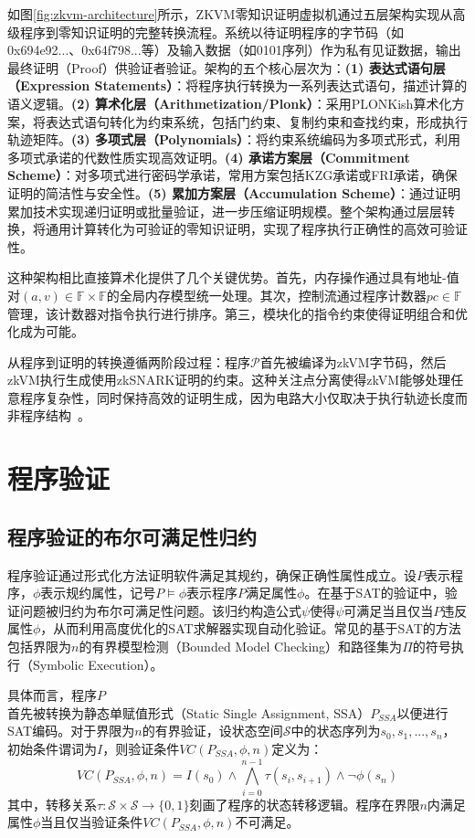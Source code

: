 如图\ref{fig:zkvm-architecture}所示，ZKVM零知识证明虚拟机通过五层架构实现从高级程序到零知识证明的完整转换流程。系统以待证明程序的字节码（如0x694e92...、0x64f798...等）及输入数据（如0101序列）作为私有见证数据，输出最终证明（Proof）供验证者验证。架构的五个核心层次为：\textbf{(1) 表达式语句层（Expression Statements）}：将程序执行转换为一系列表达式语句，描述计算的语义逻辑。\textbf{(2) 算术化层（Arithmetization/Plonk）}：采用PLONKish算术化方案，将表达式语句转化为约束系统，包括门约束、复制约束和查找约束，形成执行轨迹矩阵。\textbf{(3) 多项式层（Polynomials）}：将约束系统编码为多项式形式，利用多项式承诺的代数性质实现高效证明。\textbf{(4) 承诺方案层（Commitment Scheme）}：对多项式进行密码学承诺，常用方案包括KZG承诺或FRI承诺，确保证明的简洁性与安全性。\textbf{(5) 累加方案层（Accumulation Scheme）}：通过证明累加技术实现递归证明或批量验证，进一步压缩证明规模。整个架构通过层层转换，将通用计算转化为可验证的零知识证明，实现了程序执行正确性的高效可验证性。

这种架构相比直接算术化提供了几个关键优势。首先，内存操作通过具有地址-值对$(a, v) \in \mathbb{F} \times \mathbb{F}$的全局内存模型统一处理。其次，控制流通过程序计数器$pc \in \mathbb{F}$管理，该计数器对指令执行进行排序。第三，模块化的指令约束使得证明组合和优化成为可能。\cite{cryptoeprint:2020/1069}

从程序到证明的转换遵循两阶段过程：程序$\mathcal{P}$首先被编译为zkVM字节码，然后zkVM执行生成使用zkSNARK证明的约束。这种关注点分离使得zkVM能够处理任意程序复杂性，同时保持高效的证明生成，因为电路大小仅取决于执行轨迹长度而非程序结构~\cite{cryptoeprint:2024/387}。

\section{程序验证}
\subsection{程序验证的布尔可满足性归约}

程序验证通过形式化方法证明软件满足其规约，确保正确性属性成立\cite{Lanzinger_2024}。设$P$表示程序，$\phi$表示规约属性，记号$P \models \phi$表示程序$P$满足属性$\phi$。在基于SAT的验证中，验证问题被归约为布尔可满足性问题。该归约构造公式$\psi$使得$\psi$可满足当且仅当$P$违反属性$\phi$，从而利用高度优化的SAT求解器实现自动化验证。常见的基于SAT的方法包括界限为$n$的有界模型检测（Bounded Model Checking）和路径集为$\Pi$的符号执行（Symbolic Execution）。

具体而言，程序$P$首先被转换为静态单赋值形式（Static Single Assignment, SSA）$P_{SSA}$以便进行SAT编码。对于界限为$n$的有界验证，设状态空间$\mathcal{S}$中的状态序列为$s_0, s_1, ..., s_n$，初始条件谓词为$I$，则验证条件$VC(P_{SSA}, \phi, n)$定义为：
$$VC(P_{SSA}, \phi, n) = I(s_0) \wedge \bigwedge_{i=0}^{n-1} \tau(s_i, s_{i+1}) \wedge \neg\phi(s_n)$$
其中，转移关系$\tau: \mathcal{S} \times \mathcal{S} \rightarrow \{0,1\}$刻画了程序的状态转移逻辑。程序在界限$n$内满足属性$\phi$当且仅当验证条件$VC(P_{SSA}, \phi, n)$不可满足。

